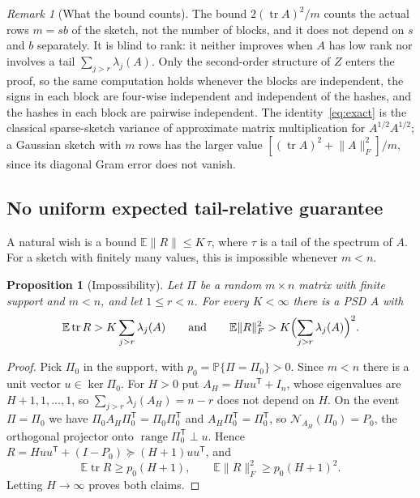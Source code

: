 \documentclass[11pt,a4paper]{article}
\newtheorem{proposition}[theorem]{Proposition}
\theoremstyle{definition}
\theoremstyle{remark}
\newtheorem{remark}[theorem]{Remark}
\newcommand{\E}{\mathbb E}
\newcommand{\Prob}{\mathbb P}
\newcommand{\tr}{\operatorname{tr}}
\newcommand{\range}{\operatorname{range}}
\newcommand{\norm}[1]{\lVert#1\rVert}
\newcommand{\Nys}{\mathcal N}
\newcommand{\1}{\mathbf 1}
\newcommand{\T}{\mathsf T}
\begin{document}
\begin{remark}[What the bound counts]\label{rem:counts}
The bound $2(\tr A)^2/m$ counts the actual rows $m=sb$ of the sketch,
not the number of blocks, and it does not depend on $s$ and $b$
separately. It is blind to rank: it neither improves when $A$ has low
rank nor involves a tail $\sum_{j>r}\lambda_j(A)$. Only the second-order
structure of $Z$ enters the proof, so the same computation holds whenever
the blocks are independent, the signs in each block are four-wise
independent and independent of the hashes, and the hashes in each block
are pairwise independent. The identity~\eqref{eq:exact} is the classical
sparse-sketch variance of approximate matrix multiplication for $A^{1/2}A^{1/2}$;
a Gaussian sketch with $m$ rows has the larger value
$[(\tr A)^2+\norm A_F^2]/m$, since its diagonal Gram error does not vanish.
\end{remark}

\subsection{No uniform expected tail-relative guarantee}
A natural wish is a bound $\E\norm{R}\le K\,\tau$, where $\tau$ is a
tail of the spectrum of $A$. For a sketch with finitely many values, this
is impossible whenever $m<n$.

\begin{proposition}[Impossibility]\label{prop:impossible}
Let $\Pi$ be a random $m\times n$ matrix with finite support and $m<n$,
and let $1\le r<n$. For every $K<\infty$ there is a PSD $A$ with
\[
 \E\tr R>K\sum_{j>r}\lambda_j(A)\qquad\text{and}\qquad
 \E\norm R_F^2>K\Bigl(\sum_{j>r}\lambda_j(A)\Bigr)^2.
\]
\end{proposition}
\begin{proof}
Pick $\Pi_0$ in the support, with $p_0=\Prob\{\Pi=\Pi_0\}>0$. Since
$m<n$ there is a unit vector $u\in\ker\Pi_0$. For $H>0$ put
$A_H=Huu^\T+I_n$, whose eigenvalues are $H+1,1,\ldots,1$, so
$\sum_{j>r}\lambda_j(A_H)=n-r$ does not depend on $H$. On the event
$\Pi=\Pi_0$ we have $\Pi_0A_H\Pi_0^\T=\Pi_0\Pi_0^\T$ and
$A_H\Pi_0^\T=\Pi_0^\T$, so $\Nys_{A_H}(\Pi_0)=P_0$, the orthogonal
projector onto $\range\Pi_0^\T\perp u$. Hence
$R=Huu^\T+(I-P_0)\succeq(H+1)uu^\T$, and
\[
 \E\tr R\ge p_0(H+1),\qquad\E\norm R_F^2\ge p_0(H+1)^2 .
\]
Letting $H\to\infty$ proves both claims.
\end{proof}
\end{document}
